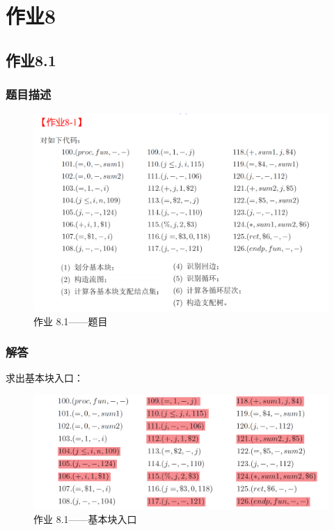 
\section{作业8}
\subsection{作业8.1}
\subsubsection{题目描述}
\begin{figure}[H]
    \centering
    \includegraphics[width=0.9\linewidth]{imgs/8_1.png}
    \caption{作业 8.1——题目}
    \label{fig:8_1_prob}
\end{figure}
\subsubsection{解答}

求出基本块入口：

\begin{figure}[H]
    \centering
    \includegraphics[width=0.9\linewidth]{imgs/8_1_1.png}
    \caption{作业 8.1——基本块入口}
    \label{fig:8_1_prob}
\end{figure}

